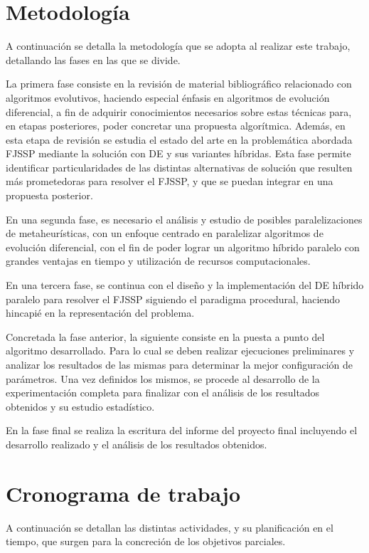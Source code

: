 \section{Metodología}

A continuación se detalla la metodología que se adopta al realizar este trabajo, detallando las fases en las que se divide.


La primera fase consiste en la revisión de material bibliográfico relacionado con algoritmos evolutivos, haciendo especial énfasis en algoritmos de evolución diferencial, a fin de adquirir conocimientos necesarios sobre estas técnicas para, en etapas posteriores, poder concretar una propuesta algorítmica. Además, en esta etapa de revisión se estudia el estado del arte en la problemática abordada FJSSP mediante la solución con DE y sus variantes híbridas. Esta fase permite identificar particularidades de las distintas alternativas de solución que resulten más prometedoras para resolver el FJSSP, y que se puedan integrar en una propuesta posterior.


En una segunda fase, es necesario el análisis y estudio de posibles paralelizaciones de metaheurísticas, con un enfoque centrado en paralelizar algoritmos de evolución diferencial, con el fin de poder lograr un algoritmo híbrido paralelo con grandes ventajas en tiempo y utilización de recursos computacionales.


En una tercera fase, se continua con el diseño y la implementación del DE híbrido paralelo para resolver el FJSSP siguiendo el paradigma procedural, haciendo hincapié en la representación del problema. 
 

Concretada la fase anterior, la siguiente consiste en la puesta a punto del algoritmo desarrollado. Para lo cual se deben realizar ejecuciones preliminares y analizar los resultados de las mismas para determinar la mejor configuración de parámetros. Una vez definidos los mismos, se procede al desarrollo de la experimentación completa para finalizar con el análisis de los resultados obtenidos y su estudio estadístico.


En la fase final se realiza la escritura del informe del proyecto final incluyendo el desarrollo realizado y el análisis de los resultados obtenidos.


\section{Cronograma de trabajo}
A continuación se detallan las distintas actividades, y su planificación en el tiempo, que surgen para la concreción de los objetivos parciales.

